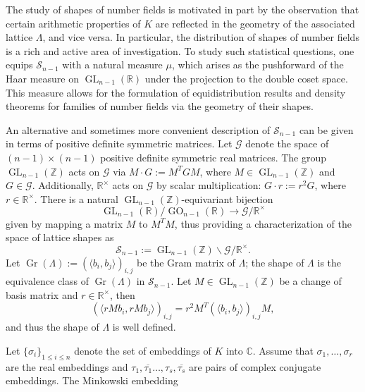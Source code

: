 \documentclass[table]{amsart}
\newcommand{\op}[1]{\operatorname{#1}}
\numberwithin{equation}{section}
\begin{document}
The study of shapes of number fields is motivated in part by the observation that certain arithmetic properties of $K$ are reflected in the geometry of the associated lattice $\Lambda$, and vice versa. In particular, the distribution of shapes of number fields is a rich and active area of investigation. To study such statistical questions, one equips $\mathcal{S}_{n-1}$ with a natural measure $\mu$, which arises as the pushforward of the Haar measure on $\operatorname{GL}_{n-1}(\mathbb{R})$ under the projection to the double coset space. This measure allows for the formulation of equidistribution results and density theorems for families of number fields via the geometry of their shapes.
\par An alternative and sometimes more convenient description of $ \mathcal{S}_{n-1} $ can be given in terms of positive definite symmetric matrices. Let $ \mathcal{G} $ denote the space of $ (n-1) \times (n-1) $ positive definite symmetric real matrices. The group $ \operatorname{GL}_{n-1}(\mathbb{Z}) $ acts on $ \mathcal{G} $ via $M \cdot G := M^TGM$, where $M \in \operatorname{GL}_{n-1}(\mathbb{Z})$ and $G \in \mathcal{G}$. Additionally, $ \mathbb{R}^\times $ acts on $ \mathcal{G} $ by scalar multiplication:  
$G \cdot r := r^2 G$, where $r \in \mathbb{R}^\times$. There is a natural $ \operatorname{GL}_{n-1}(\mathbb{Z}) $-equivariant bijection \[\operatorname{GL}_{n-1}(\mathbb{R}) / \operatorname{GO}_{n-1}(\mathbb{R}) \to \mathcal{G} / \mathbb{R}^\times\]
given by mapping a matrix $ M $ to $ M^TM $, thus providing a characterization of the space of lattice shapes as 
\begin{equation}\label{new interpretation}\mathcal{S}_{n-1} :=\operatorname{GL}_{n-1}(\mathbb{Z}) \backslash \mathcal{G}/\mathbb{R}^\times.\end{equation} Let $\op{Gr}(\Lambda):=(\langle b_i, b_j\rangle)_{i,j}$ be the Gram matrix of $\Lambda$; the shape of $\Lambda$ is the equivalence class of $\op{Gr}(\Lambda)$ in $\mathcal{S}_{n-1}$. Let $M\in \op{GL}_{n-1}(\mathbb{Z})$ be a change of basis matrix and $r\in \mathbb{R}^\times$, then
\[(\langle r M b_i, r M b_j\rangle)_{i,j}=r^2M^T(\langle b_i, b_j\rangle)_{i,j}M,\] and thus the shape of $\Lambda$ is well defined.
\par Let $ \{\sigma_i\}_{1 \leq i \leq n} $ denote the set of embeddings of $ K $ into $ \mathbb{C} $. Assume that $\sigma_1, \dots, \sigma_r$ are the real embeddings and $\tau_1, \overline{\tau_1} \dots, \tau_s, \overline{\tau_s}$ are pairs of complex conjugate embeddings. The Minkowski embedding  
\end{document}
